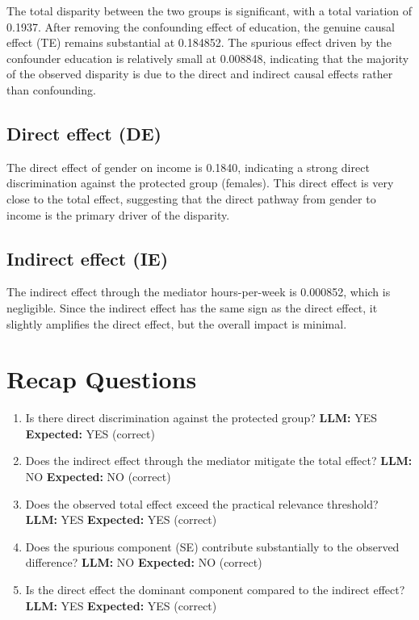 \documentclass[11pt]{article}
\begin{document}
The total disparity between the two groups is significant, with a total variation of 0.1937. After removing the confounding effect of education, the genuine causal effect (TE) remains substantial at 0.184852. The spurious effect driven by the confounder education is relatively small at 0.008848, indicating that the majority of the observed disparity is due to the direct and indirect causal effects rather than confounding.

\subsection{Direct effect (DE)}

The direct effect of gender on income is 0.1840, indicating a strong direct discrimination against the protected group (females). This direct effect is very close to the total effect, suggesting that the direct pathway from gender to income is the primary driver of the disparity.

\subsection{Indirect effect (IE)}

The indirect effect through the mediator hours-per-week is 0.000852, which is negligible. Since the indirect effect has the same sign as the direct effect, it slightly amplifies the direct effect, but the overall impact is minimal.

\section{Recap Questions}

\begin{enumerate}
\item Is there direct discrimination against the protected group? \textbf{LLM:} YES \quad \textbf{Expected:} YES \quad (correct)
\item Does the indirect effect through the mediator mitigate the total effect? \textbf{LLM:} NO \quad \textbf{Expected:} NO \quad (correct)
\item Does the observed total effect exceed the practical relevance threshold? \textbf{LLM:} YES \quad \textbf{Expected:} YES \quad (correct)
\item Does the spurious component (SE) contribute substantially to the observed difference? \textbf{LLM:} NO \quad \textbf{Expected:} NO \quad (correct)
\item Is the direct effect the dominant component compared to the indirect effect? \textbf{LLM:} YES \quad \textbf{Expected:} YES \quad (correct)
\end{enumerate}
\end{document}
